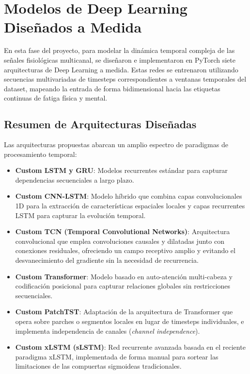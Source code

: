 \documentclass[12pt, a4paper]{article}
\begin{document}
\section{Modelos de Deep Learning Diseñados a Medida}
\label{sec:modelos_deep_learning}

En esta fase del proyecto, para modelar la dinámica temporal compleja de las señales fisiológicas multicanal, se diseñaron e implementaron en PyTorch siete arquitecturas de Deep Learning a medida. Estas redes se entrenaron utilizando secuencias multivariadas de timesteps correspondientes a ventanas temporales del dataset, mapeando la entrada de forma bidimensional hacia las etiquetas continuas de fatiga física y mental.

\subsection{Resumen de Arquitecturas Diseñadas}

Las arquitecturas propuestas abarcan un amplio espectro de paradigmas de procesamiento temporal:
\begin{itemize}
    \item \textbf{Custom LSTM y GRU}: Modelos recurrentes estándar para capturar dependencias secuenciales a largo plazo.
    \item \textbf{Custom CNN-LSTM}: Modelo híbrido que combina capas convolucionales 1D para la extracción de características espaciales locales y capas recurrentes LSTM para capturar la evolución temporal.
    \item \textbf{Custom TCN (Temporal Convolutional Networks)}: Arquitectura convolucional que emplea convoluciones causales y dilatadas junto con conexiones residuales, ofreciendo un campo receptivo amplio y evitando el desvanecimiento del gradiente sin la necesidad de recurrencia.
    \item \textbf{Custom Transformer}: Modelo basado en auto-atención multi-cabeza y codificación posicional para capturar relaciones globales sin restricciones secuenciales.
    \item \textbf{Custom PatchTST}: Adaptación de la arquitectura de Transformer que opera sobre parches o segmentos locales en lugar de timesteps individuales, e implementa independencia de canales (\emph{channel independence}).
    \item \textbf{Custom xLSTM (sLSTM)}: Red recurrente avanzada basada en el reciente paradigma xLSTM, implementada de forma manual para sortear las limitaciones de las compuertas sigmoideas tradicionales.
\end{itemize}
\end{document}
